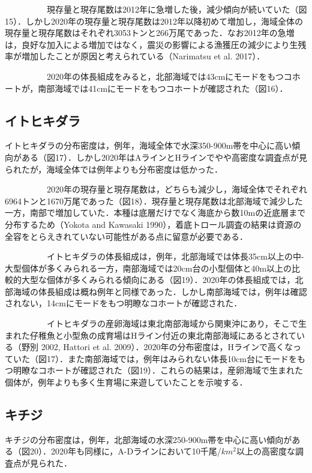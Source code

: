 \documentclass[11pt]{article} %
\begin{document}
\begin{linenumbers}
\ \ \ \ \ \ \ \ \ \ 
現存量と現存尾数は2012年に急増した後，減少傾向が続いていた（図15）．しかし2020年の現存量と現存尾数は2012年以降初めて増加し，海域全体の現存量と現存尾数はそれぞれ3053トンと266万尾であった．なお2012年の急増は，良好な加入による増加ではなく，震災の影響による漁獲圧の減少により生残率が増加したことが原因と考えられている（Narimatsu et al. 2017）．

\ \ \ \ \ \ \ \ \ \ 
2020年の体長組成をみると，北部海域では43cmにモードをもつコホートが，南部海域では41cmにモードをもつコホートが確認された（図16）．


\subsection{イトヒキダラ}
イトヒキダラの分布密度は，例年，海域全体で水深350-900m帯を中心に高い傾向がある（図17）．しかし2020年はAラインとHラインでやや高密度な調査点が見られたが，海域全体では例年よりも分布密度は低かった．

\ \ \ \ \ \ \ \ \ \ 
2020年の現存量と現存尾数は，どちらも減少し，海域全体でそれぞれ6964トンと1670万尾であった（図18）．現存量と現存尾数は北部海域で減少した一方，南部で増加していた．本種は底層だけでなく海底から数10mの近底層まで分布するため（Yokota and Kawasaki 1990），着底トロール調査の結果は資源の全容をとらえきれていない可能性がある点に留意が必要である．

\ \ \ \ \ \ \ \ \ \ 
イトヒキダラの体長組成は，例年，北部海域では体長35cm以上の中-大型個体が多くみられる一方，南部海域では20cm台の小型個体と40m以上の比較的大型な個体が多くみられる傾向にある（図19）．2020年の体長組成では，北部海域の体長組成は概ね例年と同様であった．しかし南部海域では，例年は確認されない，14cmにモードをもつ明瞭なコホートが確認された．

\ \ \ \ \ \ \ \ \ \ 
イトヒキダラの産卵海域は東北南部海域から関東沖にあり，そこで生まれた仔稚魚と小型魚の成育場はHライン付近の東北南部海域にあるとされている（野別 2002, Hattori et al. 2009）．2020年の分布密度は，Hラインで高くなっていた（図17）．また南部海域では，例年はみられない体長10cm台にモードをもつ明瞭なコホートが確認された（図19）．これらの結果は，産卵海域で生まれた個体が，例年よりも多く生育場に来遊していたことを示唆する．


\subsection{キチジ}
キチジの分布密度は，例年，北部海域の水深250-900m帯を中心に高い傾向がある（図20）．2020年も同様に，A-Dラインにおいて10千尾/$km^2$以上の高密度な調査点が見られた．


\end{linenumbers}
\end{document}
